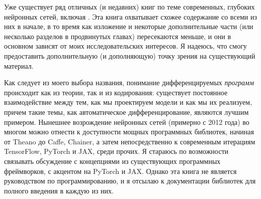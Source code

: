 Уже существует ряд отличных (и недавних) книг по теме современных, глубоких нейронных сетей, включая \cite{prince2023understanding, zhang2023dive,bishop2024deep,fleuret2023little,hardt2022patterns}. Эта книга охватывает схожее содержание со всеми из них в начале, в то время как изложение и некоторые дополнительные части (или несколько разделов в продвинутых главах) пересекаются меньше, и они в основном зависят от моих исследовательских интересов. Я надеюсь, что смогу предоставить дополнительную (и дополняющую) точку зрения на существующий материал.


Как следует из моего выбора названия, понимание дифференцируемых \textit{программ} происходит как из теории, так и из кодирования: существует постоянное взаимодействие между тем, как мы проектируем модели и как мы их реализуем, причем такие темы, как автоматическое дифференцирование, являются лучшим примером. Нынешнее возрождение нейронных сетей (примерно с 2012 года) во многом можно отнести к доступности мощных программных библиотек, начиная от Theano \cite{al2016theano} до Caffe, Chainer, а затем непосредственно к современным итерациям TensorFlow, PyTorch и JAX, среди прочих. Я стараюсь по возможности связывать обсуждение с концепциями из существующих программных фреймворков, с акцентом на PyTorch и JAX. Однако эта книга не является руководством по программированию, и я отсылаю к документации библиотек для полного введения в каждую из них.

